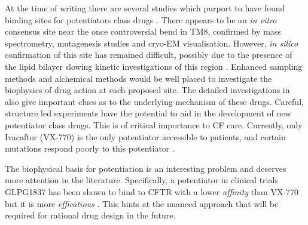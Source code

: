 At the time of writing there are several studies which purport to have found binding sites for potentiators class drugs \cite{yeh2019, laselva2021a, liu2019, baatallah2021}. There appears to be an \textit {in vitro} consensus site near the once controversial bend in TM8, confirmed by mass spectrometry, mutagenesis studies and cryo-EM visualisation. However, \textit{in silico} confirmation of this site has remained difficult, possibly due to the presence of the lipid bilayer slowing kinetic investigations of this region \cite{laselva2021a}. Enhanced sampling methods and alchemical methods would be well placed to investigate the biophysics of drug action at each proposed site. The detailed investigations in \cite{csanady2019} also give important clues as to the underlying mechanism of these drugs. Careful, structure led experiments have the potential to aid in the development of new potentiator class drugs. This is of critical importance to CF care. Currently, only Ivacaftor (VX-770)  is the only potentiator accessible to patients, and certain mutations respond poorly to this potentiator \cite{phuan2018, vangoor2014}. 

The biophysical basis for potentiation is an interesting problem and deserves more attention in the literature. Specifically, a potentiator in clinical trials GLPG1837 has been shown to bind to CFTR with a lower \textit{affinity} than VX-770 but it is more \textit{efficatious} \cite{yeh2019, yeh2017,vanderplas2018}. This hints at the nuanced approach that will be required for rational drug design in the future.

